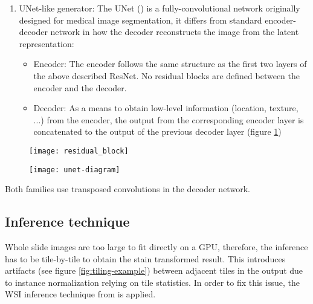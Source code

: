 \documentclass[../main.tex]{subfiles}
\begin{document}
\begin{enumerate}
  \item UNet-like generator: The UNet (\cite{Ronneberger2015}) is a
  fully-convolutional network originally designed for medical image segmentation,
  it differs from standard encoder-decoder network in how the decoder
  reconstructs the image from the latent representation:
  \begin{itemize}
  \item Encoder: The encoder follows the same structure as the first two layers
  of the above described ResNet. No residual blocks are defined between the
  encoder and the decoder.
  \item Decoder: As a means to obtain low-level information
  (location, texture, ...) from the encoder,
  the output from the corresponding encoder layer is concatenated to the output
  of the previous decoder layer (figure \ref{fig:unet-diagram})
  \end{itemize}
\end{enumerate}

\begin{figure}[t]
\centering
\begin{minipage}{.5\textwidth}
\centering
\texttt{[image: residual\_block]}
\label{fig:residual-block}
\end{minipage}%
\begin{minipage}{.5\textwidth}
\centering
\texttt{[image: unet-diagram]}
\label{fig:unet-diagram}
\end{minipage}
\end{figure}

Both families use transposed convolutions\footnotemark[\value{footnote}]{}
in the decoder network.


\subsection{Inference technique}\label{sec:inference}
Whole slide images are too large to fit directly on a GPU, therefore,
the inference has to be tile-by-tile to obtain the stain transformed result.
This introduces artifacts (see figure \ref{fig:tiling-example}) between
adjacent tiles in the output due to
instance normalization relying on tile statistics.
In order to fix this issue, the WSI inference technique from \cite{Bel2019}
is applied.
\end{document}
